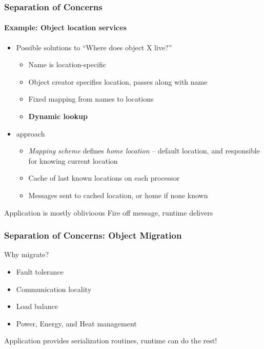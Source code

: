 \begin{frame}
\frametitle{Separation of Concerns}
\framesubtitle{Example: Object location services}
\begin{itemize}[<+->]
\item Possible solutions to ``Where does object X live?''
\begin{itemize}[<+->]
\item Name is location-specific
\item Object creator specifies location, passes along with name
\item Fixed mapping from names to locations
\item \textbf{Dynamic lookup}
\end{itemize}
\item \charm approach
\begin{itemize}
\item \emph{Mapping scheme} defines \emph{home location} -- default location, and responsible for knowing current location
\item Cache of last known locations on each processor
\item Messages sent to cached location, or home if none known
\end{itemize}
\end{itemize}
\pause
\begin{block}{Application is mostly oblivioous}
Fire off message, runtime delivers
\end{block}
\end{frame}

\begin{frame}
\frametitle{Separation of Concerns: Object Migration}
\begin{block}{Why migrate?}
\begin{itemize}
\item Fault tolerance
\item Communication locality
\item Load balance
\item Power, Energy, and Heat management
\end{itemize}
\end{block}
\pause
Application provides serialization routines, runtime can do the rest!
\end{frame}

